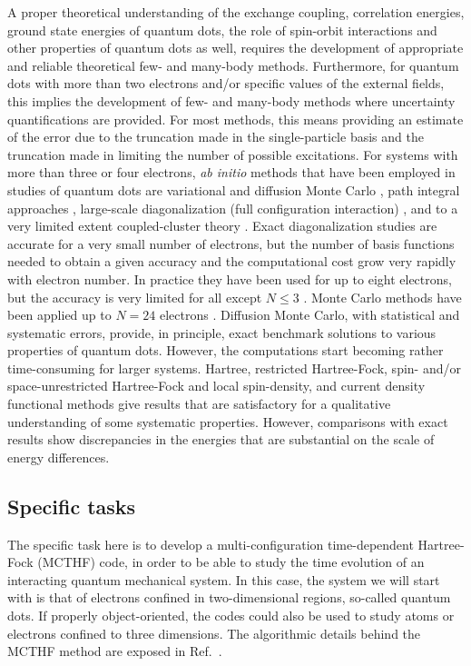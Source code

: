 \documentclass[twocolumn]{revtex4}
\begin{document}
A proper theoretical understanding of the exchange coupling, correlation energies, 
ground state energies of quantum dots, the role of spin-orbit interactions
and other properties of quantum dots as well, requires the development of appropriate and reliable  
theoretical  few- and many-body methods. 
Furthermore, for quantum dots with more than two electrons and/or specific values of the 
external fields, this implies the development of few- and many-body methods where   
uncertainty
quantifications are provided.  
For most methods, this means providing an estimate of the error due 
to the truncation made in the single-particle basis and the truncation made in 
limiting the number of possible excitations.
For systems with more than three or four electrons,  {\em ab initio} methods that have 
been employed in studies of quantum dots are
 variational and diffusion Monte Carlo \cite{harju2005,pederiva2001, pederiva2003}, path integral approaches \cite{pi1999}, 
large-scale diagonalization (full configuration 
interaction) \cite{Eto97,Maksym90,simen2008,modena2000}, and to a very limited extent 
coupled-cluster theory \cite{shavittbartlett2009,bartlett2007,bartlett2003,indians,us2011}. 
Exact diagonalization studies are accurate for a very small number
of electrons, but the number of basis functions needed to obtain a given
accuracy and the computational cost grow very rapidly with electron number.
In practice they have been used for up to eight electrons\cite{Eto97,Maksym90,modena2000}, but the accuracy is
very limited for all except $N\le 3$ .  
Monte Carlo methods have been applied up to $N=24$ electrons 
\cite{pederiva2001,pederiva2003}. Diffusion Monte Carlo, with statistical and systematic errors, provide, in principle,
exact benchmark solutions to various properties of quantum dots. However, 
the computations start becoming rather time-consuming for larger systems.   
Hartree\cite{Kum90}, restricted Hartree-Fock, spin- and/or space-unrestricted
Hartree-Fock\cite{Fuj96,Mul96,Yan99} and
local spin-density, and current density functional methods\cite{Kos97,Hir99,finns1,finns2}
give results that are satisfactory for a qualitative understanding of some
systematic properties. However, comparisons with exact results show
discrepancies in the energies that are substantial
on the scale of energy differences. 


\subsection*{Specific tasks}
The specific task here is to develop a multi-configuration time-dependent Hartree-Fock (MCTHF) code, in order to be able to study the time evolution of an interacting quantum mechanical system. In this case, the system
we will start with is that of electrons confined in two-dimensional regions, so-called quantum dots.
If properly object-oriented, the codes could also be used to study atoms or electrons confined to
three dimensions. The algorithmic details behind the MCTHF method are exposed in Ref.~\cite{mcthf}.
\end{document}
